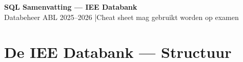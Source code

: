 \documentclass[10pt,a4paper]{article}
\begin{document}
\begin{tcolorbox}[colback=sqlpurple!10,colframe=sqlpurple,boxrule=1.2pt,arc=5pt,top=4pt,bottom=4pt]
\begin{center}
{\Large\bfseries\color{sqlpurple} SQL Samenvatting --- IEE Databank}\\[1pt]
{\small Databeheer ABL 2025--2026 \quad|\quad Cheat sheet mag gebruikt worden op examen}
\end{center}
\end{tcolorbox}
\vspace{4pt}

\section{De IEE Databank --- Structuur}
\end{document}
